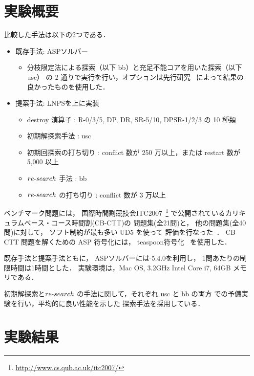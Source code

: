 \section{実験概要}
比較した手法は以下の2つである．
\begin{itemize}\compress
\item 既存手法: ASPソルバー{\clingo}
 \begin{itemize}
  \item 分枝限定法による探索（以下 bb）と充足不能コアを用いた探索（以下 usc）
  の 2 通りで実行を行い，オプションは先行研究~\cite{anor/Banbara2019}
  によって結果の良かったものを使用した．
 \end{itemize}
\item 提案手法: LNPSを{\clingo}上に実装
 \begin{itemize}
  \item destroy 演算子 : R-0/3/5, DP, DR, SR-5/10, DPSR-1/2/3 の 10 種類
  \item 初期解探索手法 : usc
  \item 初期回探索の打ち切り : conflict 数が 250 万以上，または restart 数が 5,000 以上
  \item $re\mathchar`-search$ 手法 : bb
  \item $re\mathchar`-search$ の打ち切り : conflict 数が 3 万以上
  
 \end{itemize}
\end{itemize}

ベンチマーク問題には，
国際時間割競技会ITC2007~\footnote{%
  \url{http://www.cs.qub.ac.uk/itc2007/}}
で公開されているカリキュラムベース・コース時間割(CB-CTT)の
問題集(全21問)と，
他の問題集(全40問)に対して，
ソフト制約が最も多い UD5 を使って
評価を行なった~\cite{GasperoMS/ITC2007,DBLP:journals/anor/BonuttiCGS12}．
CB-CTT 問題を解くための ASP 符号化には，
\textsf{teaspoon}符号化~\cite{anor/Banbara2019}
を使用した．
%

既存手法と提案手法ともに，
ASPソルバーには{\clingo}-5.4.0を利用し，
1問あたりの制限時間は1時間とした．
実験環境は，Mac OS, 3.2GHz Intel Core i7, 64GB メモリである．

初期解探索と$re\mathchar`-search$
の手法に関して，それぞれ usc と bb の両方
での予備実験を行い，平均的に良い性能を示した
探索手法を採用している．

\section{実験結果}

